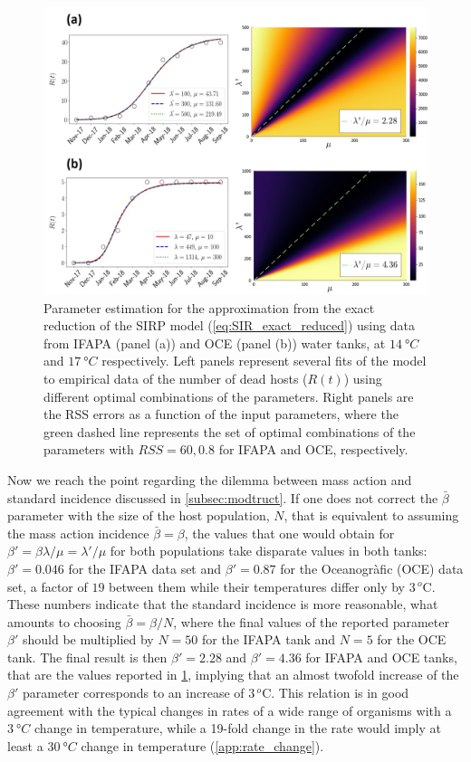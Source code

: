 \begin{figure}[H]
    \centering
    \includegraphics[width=1\textwidth]{Figures/exact_SIR_fitting.jpg}
    \caption{Parameter estimation for the approximation from the exact
        reduction of the SIRP model (\cref{eq:SIR_exact_reduced}) using data
        from IFAPA
        (panel (a)) and OCE (panel (b)) water tanks, at $\SI{14}{\degree C}$
        and
        $\SI{17}{\degree C}$ respectively. Left panels represent several fits
        of the
        model to empirical data of the number of dead hosts ($R(t)$) using
        different
        optimal combinations of the parameters. Right panels are the RSS
        errors as a
        function of the input parameters, where the green dashed line
        represents the
        set of optimal combinations of the parameters with $RSS=60, 0.8$ for
        IFAPA and
        OCE, respectively.}
    \label{fig: exact_SIR_fit}
\end{figure}

Now we reach the point regarding the dilemma between mass action and
standard incidence discussed in \cref{subsec:modtruct}. If one does not correct
the $\bar{\beta}$ parameter with the size of the host population, $N$, that is
equivalent to assuming the mass action incidence $\bar{\beta}=\beta$, the
values that one would obtain for $\beta'=\beta\lambda/\mu=\lambda'/\mu$ for
both populations take disparate values in both tanks: $\beta'=0.046$ for the
IFAPA data set and $\beta'=0.87$ for the Oceanogràfic (OCE) data set, a factor
of $19$ between them while their temperatures differ only by $3\,{}^o$C.
These numbers indicate that the standard incidence is more reasonable, what
amounts to choosing $\bar{\beta}=\beta/N$, where the final values of the
reported parameter $\beta'$ should be multiplied by $N=50$ for the IFAPA tank
and $N=5$ for the OCE tank. The final result is then $\beta'=2.28$ and
$\beta'=4.36$ for IFAPA and OCE tanks, that are the values reported in
\cref{fig: exact_SIR_fit}, implying that an almost twofold increase of the
$\beta'$ parameter corresponds to an increase of $3\,{}^o$C. This relation is
in good agreement with the typical changes in rates of a wide range of
organisms with a $\SI{3}{\degree C}$ change in temperature, while a 19-fold
change in the rate would imply at least a $\SI{30}{\degree C}$ change in
temperature (\cref{app:rate_change}).

